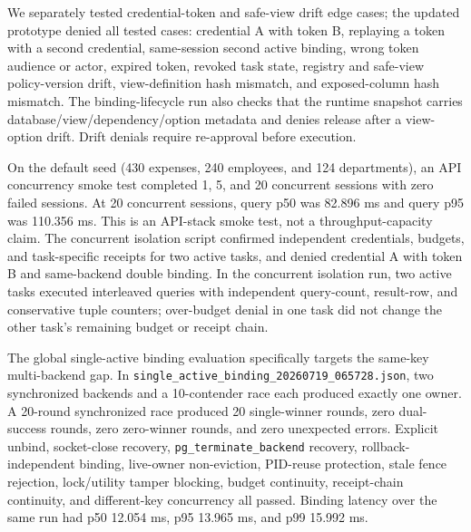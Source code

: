 \documentclass[journal]{IEEEtran}
\begin{document}
We separately tested credential-token and safe-view drift edge cases; the
updated prototype denied all tested cases: credential A with token B,
replaying a token with a second credential, same-session second active
binding, wrong token audience or actor, expired token, revoked task
state, registry and safe-view policy-version drift, view-definition hash
mismatch, and exposed-column hash mismatch. The binding-lifecycle run also
checks that the runtime snapshot carries database/view/dependency/option
metadata and denies release after a view-option drift. Drift denials
require re-approval before execution.

On the default seed (430 expenses, 240 employees, and 124 departments),
an API concurrency smoke test completed 1, 5, and 20 concurrent sessions
with zero failed sessions. At 20 concurrent sessions, query p50 was
82.896 ms and query p95 was 110.356 ms. This is an API-stack smoke test,
not a throughput-capacity claim.
The concurrent isolation script confirmed independent credentials,
budgets, and task-specific receipts for two active tasks, and denied
credential A with token B and same-backend double binding. In the
concurrent isolation run, two active tasks executed interleaved queries
with independent query-count, result-row, and conservative tuple counters;
over-budget denial in one task did not change the other task's remaining
budget or receipt chain.

The global single-active binding evaluation specifically targets the
same-key multi-backend gap. In
\texttt{single\_active\_binding\_20260719\_065728.json}, two synchronized
backends and a 10-contender race each produced exactly one owner. A
20-round synchronized race produced 20 single-winner rounds, zero
dual-success rounds, zero zero-winner rounds, and zero unexpected
errors. Explicit unbind, socket-close recovery,
\texttt{pg\_terminate\_backend} recovery, rollback-independent binding,
live-owner non-eviction, PID-reuse protection, stale fence rejection,
lock/utility tamper blocking, budget continuity, receipt-chain
continuity, and different-key concurrency all passed. Binding latency
over the same run had p50 12.054 ms, p95 13.965 ms, and p99 15.992 ms.
\end{document}
